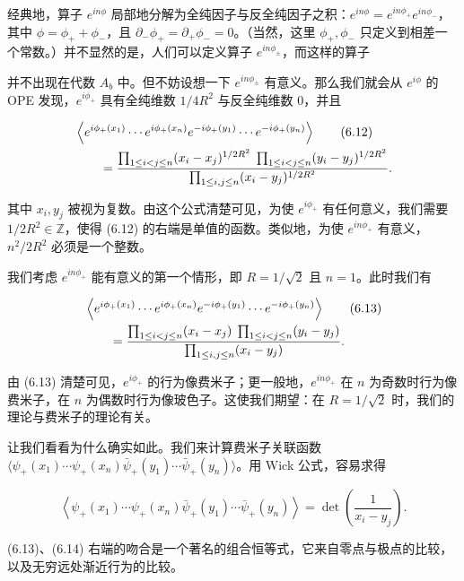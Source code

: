 经典地，算子 $e^{in\phi}$ 局部地分解为全纯因子与反全纯因子之积：$e^{in\phi}=e^{in\phi_+}e^{in\phi_-}$，其中 $\phi=\phi_++\phi_-$，且 $\partial_-\phi_+=\partial_+\phi_-=0$。（当然，这里 $\phi_+,\phi_-$ 只定义到相差一个常数。）并不显然的是，人们可以定义算子 $e^{in\phi_\pm}$，而这样的算子

并不出现在代数 $A_b$ 中。但不妨设想一下 $e^{in\phi_\pm}$ 有意义。那么我们就会从 $e^{i\phi}$ 的 OPE 发现，$e^{i\phi_+}$ 具有全纯维数 $1/4R^2$ 与反全纯维数 $0$，并且

\begin{align}
  & \left\langle e^{i\phi_+(x_1)}\cdots e^{i\phi_+(x_n)}e^{-i\phi_+(y_1)}\cdots e^{-i\phi_+(y_n)}\right\rangle \tag{6.12}\label{eq:6-12}\\
  & \qquad =\frac{\prod_{1\le i<j\le n}(x_i-x_j)^{1/2R^2}\;\prod_{1\le i<j\le n}(y_i-y_j)^{1/2R^2}}{\prod_{1\le i,j\le n}(x_i-y_j)^{1/2R^2}}.\notag
\end{align}

其中 $x_i,y_j$ 被视为复数。由这个公式清楚可见，为使 $e^{i\phi_+}$ 有任何意义，我们需要 $1/2R^2\in\mathbb{Z}$，使得 (6.12) 的右端是单值的函数。类似地，为使 $e^{in\phi_+}$ 有意义，$n^2/2R^2$ 必须是一个整数。

我们考虑 $e^{in\phi_+}$ 能有意义的第一个情形，即 $R=1/\sqrt2$ 且 $n=1$。此时我们有

\begin{align}
  & \left\langle e^{i\phi_+(x_1)}\cdots e^{i\phi_+(x_n)}e^{-i\phi_+(y_1)}\cdots e^{-i\phi_+(y_n)}\right\rangle \tag{6.13}\label{eq:6-13}\\
  & \qquad =\frac{\prod_{1\le i<j\le n}(x_i-x_j)\;\prod_{1\le i<j\le n}(y_i-y_j)}{\prod_{1\le i,j\le n}(x_i-y_j)}.\notag
\end{align}

由 (6.13) 清楚可见，$e^{i\phi_+}$ 的行为像费米子；更一般地，$e^{in\phi_+}$ 在 $n$ 为奇数时行为像费米子，在 $n$ 为偶数时行为像玻色子。这使我们期望：在 $R=1/\sqrt2$ 时，我们的理论与费米子的理论有关。

让我们看看为什么确实如此。我们来计算费米子关联函数 $\langle\psi_+(x_1)\cdots\psi_+(x_n)\bar\psi_+(y_1)\cdots\bar\psi_+(y_n)\rangle$。用 Wick 公式，容易求得

\begin{equation}
  \tag{6.14}
  \label{eq:6-14}
  \left\langle\psi_+(x_1)\cdots\psi_+(x_n)\bar\psi_+(y_1)\cdots\bar\psi_+(y_n)\right\rangle=\det\left(\frac{1}{x_i-y_j}\right).
\end{equation}

(6.13)、(6.14) 右端的吻合是一个著名的组合恒等式，它来自零点与极点的比较，以及无穷远处渐近行为的比较。

